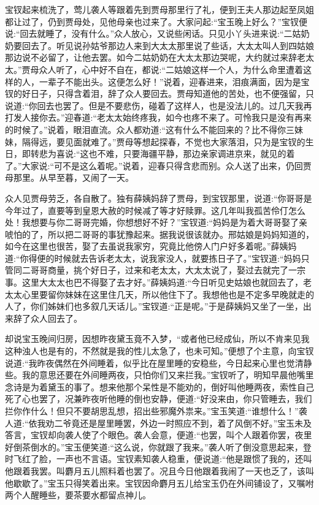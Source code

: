 \begin{parag}
    宝钗起来梳洗了，莺儿袭人等跟着先到贾母那里行了礼，便到王夫人那边起至凤姐都让过了，仍到贾母处，见他母亲也过来了。大家问起:“宝玉晚上好么？”宝钗便说:“回去就睡了，没有什么。”众人放心，又说些闲话。只见小丫头进来说:“二姑奶奶要回去了。听见说孙姑爷那边人来到大太太那里说了些话，大太太叫人到四姑娘那边说不必留了，让他去罢。如今二姑奶奶在大太太那边哭呢，大约就过来辞老太太。”贾母众人听了，心中好不自在，都说:“二姑娘这样一个人，为什么命里遭着这样的人，一辈子不能出头。这便怎么好！”说着，迎春进来，泪痕满面，因为是宝钗的好日子，只得含着泪，辞了众人要回去。贾母知道他的苦处，也不便强留，只说道:“你回去也罢了。但是不要悲伤，碰着了这样人，也是没法儿的。过几天我再打发人接你去。”迎春道:“老太太始终疼我，如今也疼不来了。可怜我只是没有再来的时候了。”说着，眼泪直流。众人都劝道:“这有什么不能回来的？比不得你三妹妹，隔得远，要见面就难了。”贾母等想起探春，不觉也大家落泪，只为是宝钗的生日，即转悲为喜说:“这也不难，只要海疆平静，那边亲家调进京来，就见的着了。”大家说:“可不是这么着呢。”说着，迎春只得含悲而别。众人送了出来，仍回贾母那里。从早至暮，又闹了一天。
\end{parag}


\begin{parag}
    众人见贾母劳乏，各自散了。独有薛姨妈辞了贾母，到宝钗那里，说道:“你哥哥是今年过了，直要等到皇恩大赦的时候减了等才好赎罪。这几年叫我孤苦伶仃怎么处！我想要与你二哥哥完婚，你想想好不好？”宝钗道:“妈妈是为着大哥哥娶了亲唬怕的了，所以把二哥哥的事犹豫起来。据我说很该就办。邢姑娘是妈妈知道的，如今在这里也很苦，娶了去虽说我家穷，究竟比他傍人门户好多着呢。”薛姨妈道:“你得便的时候就去告诉老太太，说我家没人，就要拣日子了。”宝钗道:“妈妈只管同二哥哥商量，挑个好日子，过来和老太太，大太太说了，娶过去就完了一宗事。这里大太太也巴不得娶了去才好。”薛姨妈道:“今日听见史姑娘也就回去了，老太太心里要留你妹妹在这里住几天，所以他住下了。我想他也是不定多早晚就走的人了，你们姊妹们也多叙几天话儿。”宝钗道:“正是呢。”于是薛姨妈又坐了一坐，出来辞了众人回去了。
\end{parag}


\begin{parag}
    却说宝玉晚间归房，因想昨夜黛玉竟不入梦，“或者他已经成仙，所以不肯来见我这种浊人也是有的，不然就是我的性儿太急了，也未可知。”便想了个主意，向宝钗说道:“我昨夜偶然在外间睡着，似乎比在屋里睡的安稳些，今日起来心里也觉清静些。我的意思还要在外间睡两夜，只怕你们又来拦我。”宝钗听了，明知早晨他嘴里念诗是为着黛玉的事了。想来他那个呆性是不能劝的，倒好叫他睡两夜，索性自己死了心也罢了，况兼昨夜听他睡的倒也安静，便道:“好没来由，你只管睡去，我们拦你作什么！但只不要胡思乱想，招出些邪魔外祟来。”宝玉笑道:“谁想什么！”袭人道:“依我劝二爷竟还是屋里睡罢，外边一时照应不到，着了风倒不好。”宝玉未及答言，宝钗却向袭人使了个眼色。袭人会意，便道:“也罢，叫个人跟着你罢，夜里好倒茶倒水的。”宝玉便笑道:“这么说，你就跟了我来。”袭人听了倒没意思起来，登时飞红了脸，一声也不言语。宝钗素知袭人稳重，便说道:“他是跟惯了我的，还叫他跟着我罢。叫麝月五儿照料着也罢了。况且今日他跟着我闹了一天也乏了，该叫他歇歇了。”宝玉只得笑着出来。宝钗因命麝月五儿给宝玉仍在外间铺设了，又嘱咐两个人醒睡些，要茶要水都留点神儿。
\end{parag}


